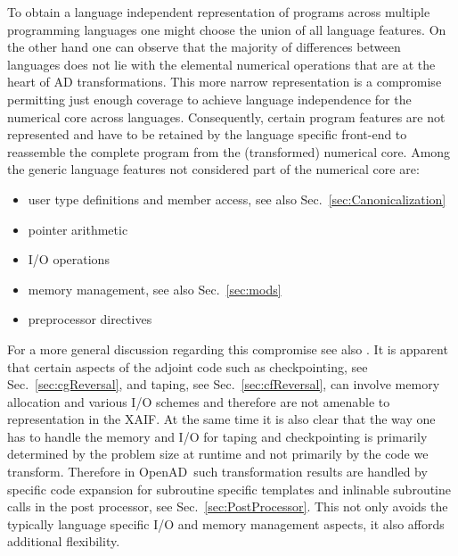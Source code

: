 \documentclass{book}
\newcommand{\OpenAD}{OpenAD}
\newcommand{\xaif}{XAIF}
\newcommand{\refsec}[1]{{Sec.~\ref{#1}}}
\begin{document}
To obtain a language independent representation of programs across multiple 
programming languages one might choose the union of all language features. 
On the other hand one can observe that the majority of differences between 
languages does not lie with the elemental numerical operations that are at the 
heart of AD transformations. This more narrow representation 
is a compromise permitting just enough coverage to achieve language 
independence for the numerical core across languages.
Consequently, certain program features are not represented and have 
to be retained by the language specific front-end to reassemble the 
complete program from the (transformed) numerical core.
Among the generic language features not considered part of the numerical core are: 
\begin{itemize}
  \parskip = -2pt
\item user type definitions and member access, see also \refsec{sec:Canonicalization}
\item pointer arithmetic
\item I/O operations  
\item memory management, see also \refsec{sec:mods}
\item preprocessor directives
\end{itemize}
For a more general discussion regarding this compromise see also \cite{Utke2004SLD}.
It is apparent that certain aspects of the adjoint code such as 
checkpointing, see \refsec{sec:cgReversal}, and taping, see \refsec{sec:cfReversal},
can involve memory allocation and various I/O schemes and therefore 
are not amenable to representation in the \xaif. 
At the same time it is also clear that the way  one has to handle the memory and I/O for 
taping and checkpointing is primarily determined by the problem size at runtime and not
primarily by the code we transform.   
Therefore in \OpenAD\ such transformation results are handled by  specific 
code expansion for subroutine specific templates and inlinable subroutine calls 
in the post processor, see \refsec{sec:PostProcessor}. This not only avoids 
the typically language specific I/O and memory management aspects, it also 
affords additional flexibility.   
\end{document}
